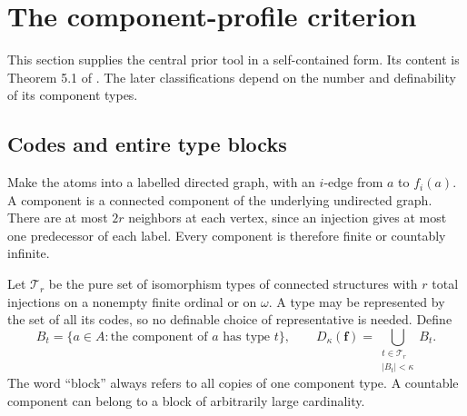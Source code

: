 \documentclass[11pt,letterpaper]{article}
\numberwithin{equation}{section}
\theoremstyle{plain}
\theoremstyle{definition}
\theoremstyle{remark}
\begin{document}
\section{The component-profile criterion}\label{nee:ca:sec:profile}

This section supplies the central prior tool in a self-contained form. Its content is Theorem 5.1 of \cite{RepoNaming}. The later classifications depend on the number and definability of its component types.

\subsection{Codes and entire type blocks}

Make the atoms into a labelled directed graph, with an $i$-edge from $a$ to $f_i(a)$. A component is a connected component of the underlying undirected graph. There are at most $2r$ neighbors at each vertex, since an injection gives at most one predecessor of each label. Every component is therefore finite or countably infinite.

Let $\mathcal T_r$ be the pure set of isomorphism types of connected structures with $r$ total injections on a nonempty finite ordinal or on $\omega$. A type may be represented by the set of all its codes, so no definable choice of representative is needed. Define
\begin{equation}\label{nee:ca:eq:blocks}
B_t=\{a\in A:\text{the component of }a\text{ has type }t\},\qquad
D_\kappa(\boldsymbol f)=\bigcup_{\substack{t\in\mathcal T_r\\ |B_t|<\kappa}}B_t.
\end{equation}
The word ``block'' always refers to all copies of one component type. A countable component can belong to a block of arbitrarily large cardinality.
\end{document}
